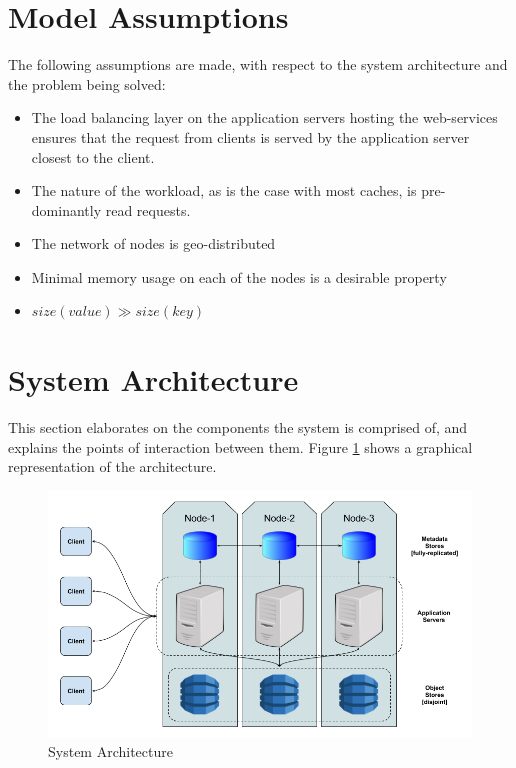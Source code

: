 \documentclass{sig-alternate}
\begin{document}
\section{Model Assumptions}
The following assumptions are made, with respect to the system architecture and the problem being solved:
\begin{itemize}
	\item The load balancing layer on the application servers hosting the web-services ensures that the request from clients is served by the application server closest to the client. 
	\item The nature of the workload, as is the case with most caches, is pre-dominantly read requests.
	\item The network of nodes is geo-distributed
	\item Minimal memory usage on each of the nodes is a desirable property
	\item $\displaystyle size(value) \gg size(key)$
\end{itemize}


\section{System Architecture}
This section elaborates on the components the system is comprised of, and explains the points of interaction between them. Figure \ref{fig:sysarch} shows a graphical representation of the architecture.\\

\begin{figure}
\centering
\includegraphics[width=\textwidth]{images/SystemArchitecture.png}
\caption{System Architecture}
\label{fig:sysarch}
\end{figure}
\end{document}
